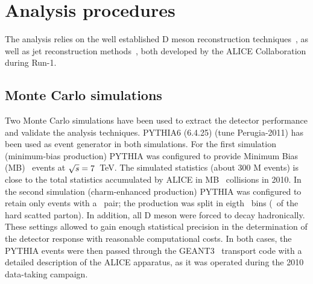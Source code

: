 \documentclass[a4paper]{jpconf}
\begin{document}
\section{Analysis procedures}
The analysis relies on the well established D meson reconstruction techniques~\cite{ALICE:2012d, ALICE:2016a}, as well as
jet reconstruction methods~\cite{ALICE:2013c, ALICE:2015a, ALICE:2015e}, both developed by the ALICE Collaboration during Run-1.

\subsection{Monte Carlo simulations}
Two Monte Carlo simulations have been used to extract the detector performance and validate the analysis techniques.
PYTHIA6 (6.4.25)\cite{Sjostrand:2006} (tune Perugia-2011) has been used as event generator in both simulations.
For the first simulation (minimum-bias production) PYTHIA was configured to provide Minimum Bias (MB) \pp\ events at $\sqrt{s}=7$~TeV.
The simulated statistics (about 300 M events) is close to the total statistics accumulated by ALICE in MB \pp\ collisions
in 2010. In the second simulation (charm-enhanced production) PYTHIA was configured to retain only events with a \ccbar\ pair; the production
was split in eigth \pthard\ bins (\pT\ of the hard scatted parton). In addition, all D meson were forced
to decay hadronically. These settings allowed to gain enough statistical precision in the determination of the detector response with reasonable
computational costs.
In both cases, the PYTHIA events were then passed through the GEANT3~\cite{GEANT3-url} transport code with a detailed description of the ALICE apparatus,
as it was operated during the 2010 data-taking campaign.
\end{document}
